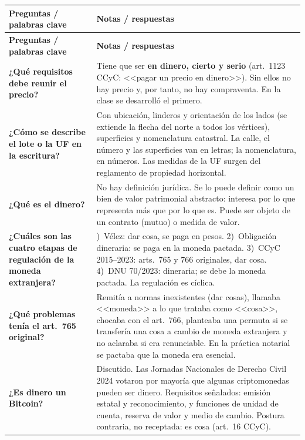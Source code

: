 \documentclass[12pt,oneside,a4paper]{book}
\begin{document}
\begin{longtable}{@{}>{\RaggedRight\arraybackslash}p{}>{\RaggedRight\arraybackslash}p{}@{}}
\toprule
\textbf{Preguntas / palabras clave} & \textbf{Notas / respuestas} \\
\midrule
\endfirsthead
\toprule
\textbf{Preguntas / palabras clave} & \textbf{Notas / respuestas} \\
\midrule
\endhead
\bottomrule
\endfoot

\textbf{¿Qué requisitos debe reunir el precio?} &
Tiene que ser \textbf{en dinero, cierto y serio} (art.~1123 CCyC: <<pagar un precio en dinero>>). Sin ellos no hay precio y, por tanto, no hay compraventa. En la clase se desarrolló el primero. \\
\addlinespace
\cmidrule{1-2}
\textbf{¿Cómo se describe el lote o la UF en la escritura?} &
Con ubicación, linderos y orientación de los lados (se extiende la flecha del norte a todos los vértices), superficies y nomenclatura catastral. La calle, el número y las superficies van en letras; la nomenclatura, en números. Las medidas de la UF surgen del reglamento de propiedad horizontal. \\
\addlinespace
\cmidrule{1-2}
\textbf{¿Qué es el dinero?} &
No hay definición jurídica. Se lo puede definir como un bien de valor patrimonial abstracto: interesa por lo que representa más que por lo que es. Puede ser objeto de un contrato (mutuo) o medida de valor. \\
\addlinespace
\cmidrule{1-2}
\textbf{¿Cuáles son las cuatro etapas de regulación de la moneda extranjera?} &
1)~Vélez: dar cosa, se paga en pesos. 2)~Obligación dineraria: se paga en la moneda pactada. 3)~CCyC 2015--2023: arts.~765 y 766 originales, dar cosa. 4)~DNU 70/2023: dineraria; se debe la moneda pactada. La regulación es cíclica. \\
\addlinespace
\cmidrule{1-2}
\textbf{¿Qué problemas tenía el art.~765 original?} &
Remitía a normas inexistentes (dar cosas), llamaba <<moneda>> a lo que trataba como <<cosa>>, chocaba con el art.~766, planteaba una permuta si se transfería una cosa a cambio de moneda extranjera y no aclaraba si era renunciable. En la práctica notarial se pactaba que la moneda era esencial. \\
\addlinespace
\cmidrule{1-2}
\textbf{¿Es dinero un Bitcoin?} &
Discutido. Las Jornadas Nacionales de Derecho Civil 2024 votaron por mayoría que algunas criptomonedas pueden ser dinero. Requisitos señalados: emisión estatal y reconocimiento, y funciones de unidad de cuenta, reserva de valor y medio de cambio. Postura contraria, no receptada: es cosa (art.~16 CCyC). \\

\end{longtable}
\end{document}
